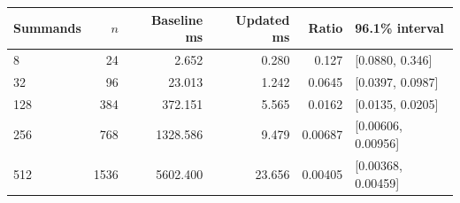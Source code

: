 \begin{tabular}{lrrrrl}
\toprule
Summands & $n$ & Baseline ms & Updated ms & Ratio & 96.1\% interval \\
\midrule
8 & 24 & 2.652 & 0.280 & 0.127 & [0.0880, 0.346] \\
32 & 96 & 23.013 & 1.242 & 0.0645 & [0.0397, 0.0987] \\
128 & 384 & 372.151 & 5.565 & 0.0162 & [0.0135, 0.0205] \\
256 & 768 & 1328.586 & 9.479 & 0.00687 & [0.00606, 0.00956] \\
512 & 1536 & 5602.400 & 23.656 & 0.00405 & [0.00368, 0.00459] \\
\bottomrule
\end{tabular}
